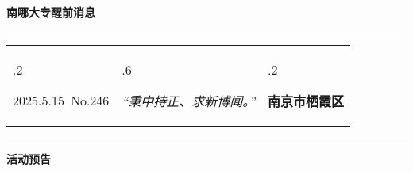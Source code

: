 \documentclass[letterpaper, 12pt]{article}
\begin{document}
\begin{center}
    \Huge\textbf{南哪大专醒前消息}
\end{center}
\vspace{4mm}
\hrule
\renewcommand\tabularxcolumn[1]{m{#1}}
\begin{tabularx}{\textwidth}{>{\hsize.2\hsize}X>{\hsize.6\hsize}X>{\hsize.2\hsize}X}
    \begin{flushleft}
        2025.5.15\, No.246
    \end{flushleft}
    &
    \begin{center}
        \textit{“秉中持正、求新博闻。”}
    \end{center}
    &
    \begin{flushright}
        \textbf{南京市栖霞区}
    \end{flushright}
\end{tabularx}
\vspace{-3.5mm}
\hrule
\vspace{4mm}
\centerline{\huge\textbf{活动预告}}
\end{document}
